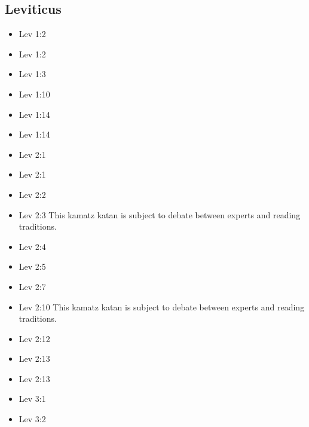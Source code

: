 \documentclass[14pt]{article}
\begin{document}
\subsection{Leviticus}
\begin{multicols}{2}\begin{itemize}
\item Lev 1:2

\item Lev 1:2

\item Lev 1:3

\item Lev 1:10

\item Lev 1:14

\item Lev 1:14

\item Lev 2:1

\item Lev 2:1

\item Lev 2:2

\item Lev 2:3 This kamatz katan is subject to debate between experts and reading traditions.

\item Lev 2:4

\item Lev 2:5

\item Lev 2:7

\item Lev 2:10 This kamatz katan is subject to debate between experts and reading traditions.

\item Lev 2:12

\item Lev 2:13

\item Lev 2:13

\item Lev 3:1

\item Lev 3:2


\end{itemize}
\end{multicols}
\end{document}
